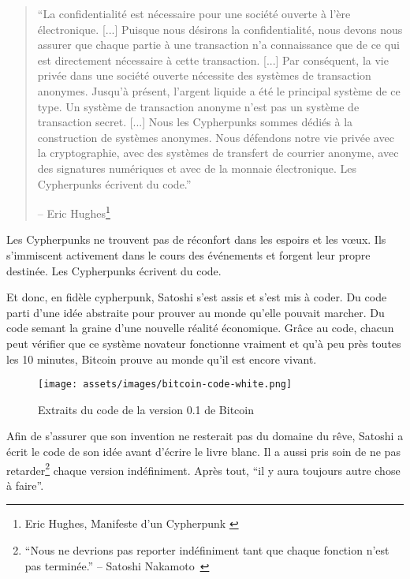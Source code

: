 \begin{quotation}\begin{samepage}
\enquote{La confidentialité est nécessaire pour une société ouverte à l'ère
électronique. [...] Puisque nous désirons la confidentialité, nous devons nous
assurer que chaque partie à une transaction n'a connaissance que de ce qui est
directement nécessaire à cette transaction. [...]
Par conséquent, la vie privée dans une société ouverte nécessite des systèmes de
transaction anonymes. Jusqu'à présent, l'argent liquide a été le principal
système de ce type. Un système de transaction anonyme n'est pas un système de
transaction secret. [...]
Nous les Cypherpunks sommes dédiés à la construction de systèmes anonymes. Nous
défendons notre vie privée avec la cryptographie, avec des systèmes de transfert
de courrier anonyme, avec des signatures numériques et avec de la monnaie
électronique.
Les Cypherpunks écrivent du code.}
\begin{flushright} -- Eric Hughes\footnote{Eric Hughes, Manifeste d'un
Cypherpunk \cite{cypherpunk-manifesto}}
\end{flushright}\end{samepage}\end{quotation}

Les Cypherpunks ne trouvent pas de réconfort dans les espoirs et les vœux. Ils
s'immiscent activement dans le cours des événements et forgent leur propre
destinée. Les Cypherpunks écrivent du code.

Et donc, en fidèle cypherpunk, Satoshi s'est assis et s'est mis à coder. Du code
parti d'une idée abstraite pour prouver au monde qu'elle pouvait marcher. Du
code semant la graine d'une nouvelle réalité économique. Grâce au code, chacun
peut vérifier que ce système novateur fonctionne vraiment et qu'à peu près
toutes les 10 minutes, Bitcoin prouve au monde qu'il est encore vivant.

\begin{figure}
  \texttt{[image: assets/images/bitcoin-code-white.png]}
  \caption{Extraits du code de la version 0.1 de Bitcoin}
  \label{fig:bitcoin-code-white}
\end{figure}

Afin de s'assurer que son invention ne resterait pas du domaine du rêve, Satoshi
a écrit le code de son idée avant d'écrire le livre blanc. Il a aussi pris soin
de ne pas retarder\footnote{\enquote{Nous ne devrions pas reporter indéfiniment
tant que chaque fonction n'est pas terminée.} -- Satoshi
Nakamoto~\cite{satoshi-delay}} chaque version indéfiniment. Après tout,
\enquote{il y aura toujours autre chose à faire}.

